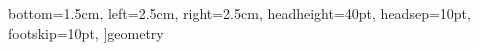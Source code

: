 bottom=1.5cm,%
left=2.5cm,%
right=2.5cm,%
%
%
headheight=40pt,%
headsep=10pt,%
footskip=10pt,%
]{geometry}
\renewcommand{\baselinestretch}{1.445}
\usepackage{multicol}
\setlength{\columnsep}{8mm}
\setlength{\parskip}{0pt plus 2pt minus 2pt} %
\renewcommand{\abstractname}{} %


\usepackage{xcolor}   %
\usepackage{etoolbox} %
\usepackage{ifthen}
\usepackage{lipsum}
\newcommand{\biaoti}[1]{\def\biaotiudf{#1}}
\def\fubiaotiudf{}
\newcommand{\fubiaoti}[1]{\def\fubiaotiudf{#1}}
\DeclareListParser*{\forcsvlista}{;}
\def\schoolinput#1{\def\schoollistudf{}%
    \forcsvlista{\listadd\schoollistudf}{#1}}
\def\authorinput#1{\def\authorlistudf{}%
    \forcsvlista{\listadd\authorlistudf}{#1}}
\def\includinput#1{\def\includelistudf{}%
    \forcsvlista{\listadd\includelistudf}{#1}}


\def\zuozhelist{%
\setcounter{includeno}{0}%
\renewcommand*{\do}[1]{\stepcounter{includeno}%
\expandafter\def\csname list\romannumeral\theincludeno\endcsname{##1}}
\dolistloop{\includelistudf}
\setcounter{authorno}{0}%
\renewcommand*{\do}[1]{\stepcounter{authorno}%
##1\textsuperscript{\csname list\romannumeral\theauthorno\endcsname}\hspace{1em}}%
\dolistloop{\authorlistudf}}

